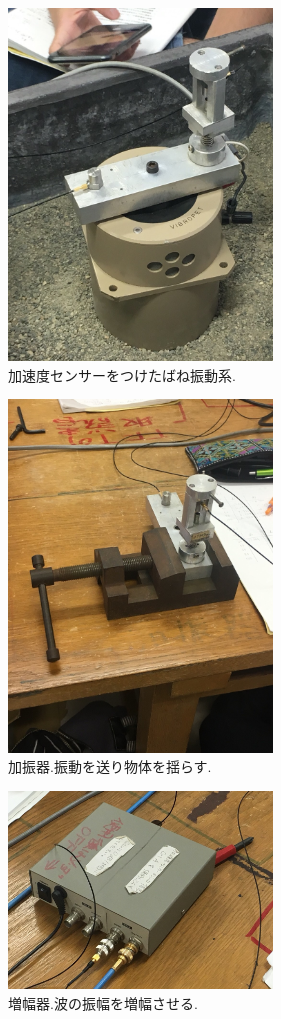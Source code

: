 \documentclass[twocolumn, 10pt,a4j]{jsarticle}
\begin{document}
  \begin{figure}[H]
    \begin{center}
      \includegraphics[width=7cm]{../img/IMG_3025.JPG}
      \caption{加速度センサーをつけたばね振動系.}
    \end{center}
  \end{figure}

  \begin{figure}[H]
    \begin{center}
      \includegraphics[width=7cm]{../img/IMG_3026.JPG}
      \caption{加振器.振動を送り物体を揺らす.}
    \end{center}
  \end{figure}

  \begin{figure}[H]
    \begin{center}
      \includegraphics[width=7cm]{../img/IMG_3029.JPG}
      \caption{増幅器.波の振幅を増幅させる.}
    \end{center}
  \end{figure}

  
\end{document}
